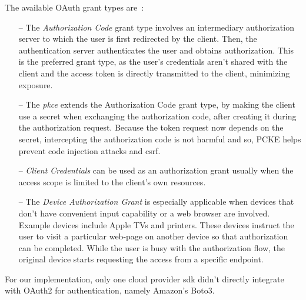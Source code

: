 The available OAuth grant types are~\cite{oauth, oauth_grants}:

\begin{itemize}
    \item [--]The \textit{Authorization Code} grant type involves an intermediary authorization server to which the user is first redirected by the client. Then, the authentication server authenticates the user and obtains authorization. This is the preferred grant type, as the user's credentials aren't shared with the client and the access token is directly transmitted to the client, minimizing exposure.

    \item [--] The \textit{\ac{pkce}} extends the Authorization Code grant type, by making the client use a secret when exchanging the authorization code, after creating it during the authorization request. Because the token request now depends on the secret, intercepting the authorization code is not harmful and so, PCKE helps prevent code injection attacks and \ac{csrf}.

    \item [--] \textit{Client Credentials} can be used as an authorization grant usually when the access scope is limited to the client's own resources.

    \item [--] The \textit{Device Authorization Grant} is especially applicable when devices that don't have convenient input capability or a web browser are involved. Example devices include Apple TVs and printers. These devices instruct the user to visit a particular web-page on another device so that authorization can be completed. While the user is busy with the authorization flow, the original device starts requesting the access from a specific endpoint.
\end{itemize}

For our implementation, only one cloud provider \ac{sdk} didn't directly integrate with OAuth2 for authentication, namely Amazon's Boto3.

